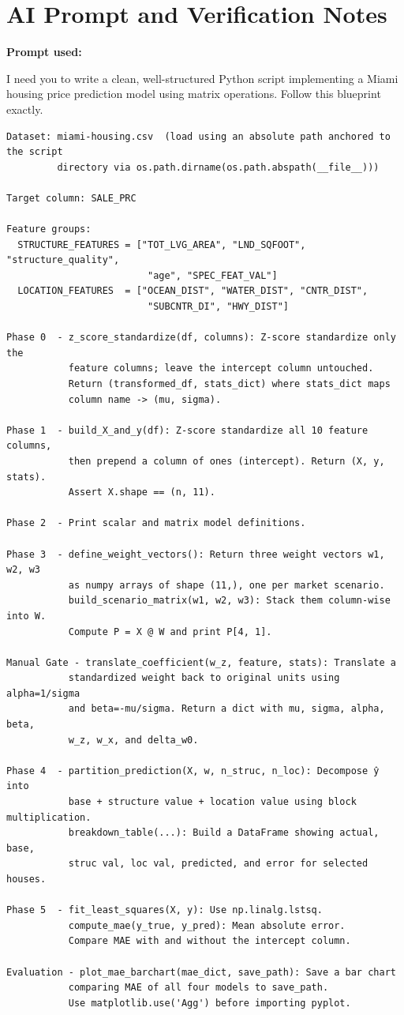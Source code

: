 \documentclass[11pt]{article}
\begin{document}
\section{AI Prompt and Verification Notes}

\textbf{Prompt used:}

I need you to write a clean, well-structured Python script implementing a Miami housing price prediction model using matrix operations. Follow this blueprint exactly.

\begin{verbatim}
Dataset: miami-housing.csv  (load using an absolute path anchored to the script
         directory via os.path.dirname(os.path.abspath(__file__)))

Target column: SALE_PRC

Feature groups:
  STRUCTURE_FEATURES = ["TOT_LVG_AREA", "LND_SQFOOT", "structure_quality",
                         "age", "SPEC_FEAT_VAL"]
  LOCATION_FEATURES  = ["OCEAN_DIST", "WATER_DIST", "CNTR_DIST",
                         "SUBCNTR_DI", "HWY_DIST"]

Phase 0  - z_score_standardize(df, columns): Z-score standardize only the
           feature columns; leave the intercept column untouched.
           Return (transformed_df, stats_dict) where stats_dict maps
           column name -> (mu, sigma).

Phase 1  - build_X_and_y(df): Z-score standardize all 10 feature columns,
           then prepend a column of ones (intercept). Return (X, y, stats).
           Assert X.shape == (n, 11).

Phase 2  - Print scalar and matrix model definitions.

Phase 3  - define_weight_vectors(): Return three weight vectors w1, w2, w3
           as numpy arrays of shape (11,), one per market scenario.
           build_scenario_matrix(w1, w2, w3): Stack them column-wise into W.
           Compute P = X @ W and print P[4, 1].

Manual Gate - translate_coefficient(w_z, feature, stats): Translate a
           standardized weight back to original units using alpha=1/sigma
           and beta=-mu/sigma. Return a dict with mu, sigma, alpha, beta,
           w_z, w_x, and delta_w0.

Phase 4  - partition_prediction(X, w, n_struc, n_loc): Decompose ŷ into
           base + structure value + location value using block multiplication.
           breakdown_table(...): Build a DataFrame showing actual, base,
           struc val, loc val, predicted, and error for selected houses.

Phase 5  - fit_least_squares(X, y): Use np.linalg.lstsq.
           compute_mae(y_true, y_pred): Mean absolute error.
           Compare MAE with and without the intercept column.

Evaluation - plot_mae_barchart(mae_dict, save_path): Save a bar chart
           comparing MAE of all four models to save_path.
           Use matplotlib.use('Agg') before importing pyplot.
\end{verbatim}
\end{document}
